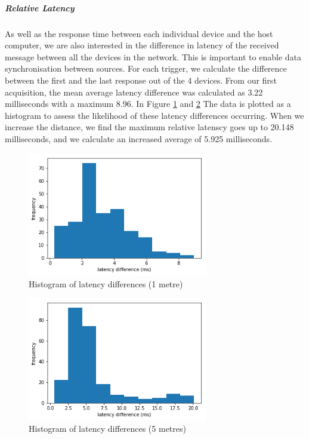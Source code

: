 \subparagraph{Relative Latency}

As well as the response time between each individual device and the host computer, we are also interested in the difference in latency of the received message between all the devices in the network. This is important to enable data synchronisation between sources. For each trigger, we calculate the difference between the first and the last response out of the 4 devices. From our first acquisition, the mean average latency difference was calculated as 3.22 milliseconds with a maximum 8.96. In Figure \ref{fig:latency_fig6} and \ref{fig:latency_fig7} The data is plotted as a histogram to assess the likelihood of these latency differences occurring. When we increase the distance, we find the maximum relative latenscy goes up to 20.148 milliseconds, and we calculate an increased average of 5.925 milliseconds.

\begin{figure}[htbp]
  \centering
    \includegraphics[width=0.7\textwidth]{Chapters/Figures/technical/Latency/figure6.png}
    \caption{Histogram of latency differences (1 metre)}
    \label{fig:latency_fig6}
\end{figure}

\begin{figure}[htbp]
  \centering
    \includegraphics[width=0.7\textwidth]{Chapters/Figures/technical/Latency/figure7.png}
    \caption{Histogram of latency differences (5 metres)}
    \label{fig:latency_fig7}
\end{figure}

